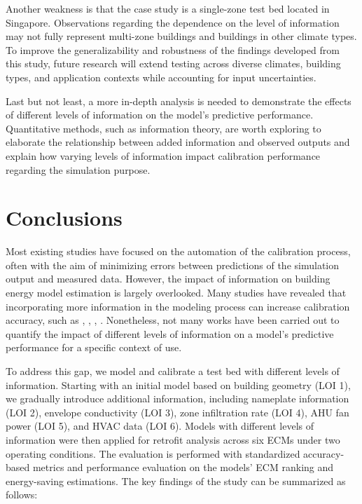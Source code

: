 \documentclass[3p,times,12pt]{elsarticle}
\begin{document}
\begin{sloppypar}
Another weakness is that the case study is a single-zone test bed located in Singapore. Observations regarding the dependence on the level of information may not fully represent multi-zone buildings and buildings in other climate types. To improve the generalizability and robustness of the findings developed from this study, future research will extend testing across diverse climates, building types, and application contexts while accounting for input uncertainties.

Last but not least, a more in-depth analysis is needed to demonstrate the effects of different levels of information on the model’s predictive performance. Quantitative methods, such as information theory, are worth exploring to elaborate the relationship between added information and observed outputs and explain how varying levels of information impact calibration performance regarding the simulation purpose.


\section{Conclusions}
\label{S:5}

Most existing studies have focused on the automation of the calibration process, often with the aim of minimizing errors between predictions of the simulation output and measured data. However, the impact of information on building energy model estimation is largely overlooked. Many studies have revealed that incorporating more information in the modeling process can increase calibration accuracy, such as \cite{kim2016stepwise}, \cite{de2018impact}, \cite{lim2018influences}, \cite{risch2021influence}. Nonetheless, not many works have been carried out to quantify the impact of different levels of information on a model's predictive performance for a specific context of use.  

To address this gap, we model and calibrate a test bed with different levels of information. Starting with an initial model based on building geometry (LOI 1), we gradually introduce additional information, including nameplate information (LOI 2), envelope conductivity (LOI 3), zone infiltration rate (LOI 4), AHU fan power (LOI 5), and HVAC data (LOI 6). Models with different levels of information were then applied for retrofit analysis across six ECMs under two operating conditions. The evaluation is performed with standardized accuracy-based metrics and performance evaluation on the models' ECM ranking and energy-saving estimations. The key findings of the study can be summarized as follows:


\end{sloppypar}
\end{document}
